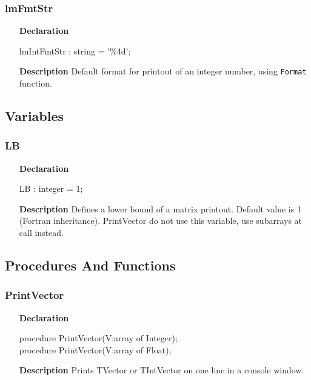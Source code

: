 \documentclass[12pt,a4paper,oneside]{report}
\newcommand{\declarationitem}[1]{\textbf{#1}}
\newcommand{\descriptiontitle}[1]{\textbf{#1}}
\newcommand{\code}[1]{\texttt{#1}}
\begin{document}
\subsubsection{lmFmtStr}
\label{uvecmatprn:lmIntFmtStr}
\begin{itemize}
	\item[\declarationitem{Declaration}\hfill]
	\begin{flushleft}
		lmIntFmtStr : string = '\%4d';
	\end{flushleft}
	\item[\descriptiontitle{Description}\hfill]
	Default format for printout of an integer number, using \code{Format} function.
\end{itemize}
\subsection{Variables}
\subsubsection{LB}
\label{uvecmatprn:LB}
\begin{itemize}
	\item[\declarationitem{Declaration}\hfill]
	\begin{flushleft}
LB : integer = 1;
	\end{flushleft}
	\item[\descriptiontitle{Description}\hfill]
	Defines a lower bound of a matrix printout. Default value is 1 (Fortran inheritance). PrintVector do not use this variable, use subarrays at call instead.
\end{itemize}
\subsection{Procedures And Functions}
\subsubsection{PrintVector}
\label{uvecmatprn:PrintVector}
\begin{itemize}
	\item[\declarationitem{Declaration}\hfill]
	\begin{flushleft}
	procedure PrintVector(V:array of Integer);\\
	procedure PrintVector(V:array of Float);
	\end{flushleft}
	\item[\descriptiontitle{Description}\hfill]
	Prints TVector or TIntVector on one line in a console window.
\end{itemize}
\end{document}
